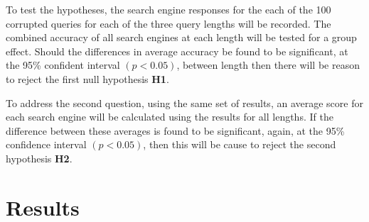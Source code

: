 \documentclass{csfourzero}
\begin{document}
To test the hypotheses, the search engine responses for the each of the 100 corrupted queries for each of the three query lengths will be recorded. The combined accuracy of all search engines at each length will be tested for a group effect. Should the differences in average accuracy be found to be significant, at the 95\% confident interval $(p < 0.05)$, between length then there will be reason to reject the first null hypothesis \textbf{H1}.

To address the second question, using the same set of results, an average score for each search engine will be calculated using the results for all lengths. If the difference between these averages is found to be significant, again, at the 95\% confidence interval $(p < 0.05)$, then this will be cause to reject the second hypothesis \textbf{H2}.

\section{Results}
\label{sec:results}
\end{document}
